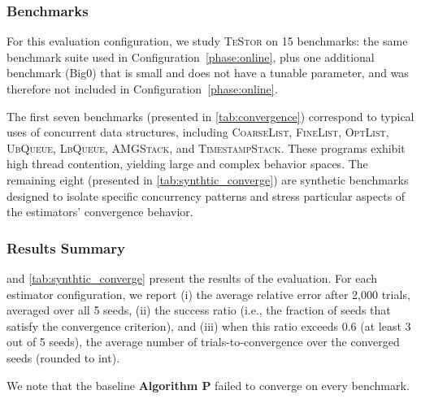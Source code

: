 \documentclass[acmsmall]{acmart}
\def\MO#1{{\textcolor{orange}{\textbf{MO:} #1}}}
\renewcommand{\MO}[1]{}
\newcommand{\testor}{\textsc{TeStor}\xspace}
\begin{document}
\subsubsection*{Benchmarks}

For this evaluation configuration, we study \testor on 15 benchmarks: the same benchmark suite used in Configuration~\ref{phase:online}, plus one additional benchmark (Big0) that is small and does not have a tunable parameter, and was therefore not included in Configuration~\ref{phase:online}.
 
The first seven benchmarks (presented in \cref{tab:convergence}) correspond to typical uses of concurrent data structures, 
including \textsc{CoarseList}, \textsc{FineList}, \textsc{OptList}, \textsc{UbQueue}, \textsc{LbQueue}, \textsc{AMGStack}, and \textsc{TimestampStack}. 
These programs exhibit high thread contention, yielding large and complex behavior spaces. 
The remaining eight (presented in \cref{tab:synthtic_converge}) are synthetic benchmarks designed to isolate specific concurrency 
patterns and stress particular aspects of the estimators’ convergence behavior.

\subsubsection*{Results Summary}

 and \ref{tab:synthtic_converge} present the results of the evaluation. 
For each estimator configuration, we report (i) the average relative error after 2,000 trials, averaged over all 5 seeds, 
(ii) the success ratio (i.e., the fraction of seeds that satisfy the convergence criterion), and 
(iii) when this ratio exceeds 0.6 (at least 3 out of 5 seeds), the average number of trials-to-convergence over the converged seeds (rounded to int).

We note that the baseline \textbf{Algorithm P} failed to converge on every benchmark.

\end{document}
